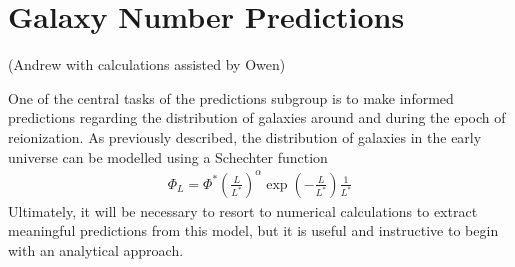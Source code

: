 
\section{Galaxy Number Predictions} %
\label{sec:galaxy_number_predictions}
(Andrew with calculations assisted by Owen)

	One of the central tasks of the predictions subgroup is to make informed predictions regarding the distribution of galaxies around and during the epoch of reionization. As previously described, the distribution of galaxies in the early universe can be modelled using a Schechter function
	\begin{align}
		\Phi_L = \Phi^*  \left(\frac{L}{L^*}\right)^\alpha \exp{\left( -\frac{L}{L^*} \right)} \frac{1}{L^*}
	\end{align}
	Ultimately, it will be necessary to resort to numerical calculations to extract meaningful predictions from this model, but it is useful and instructive to begin with an analytical approach.

